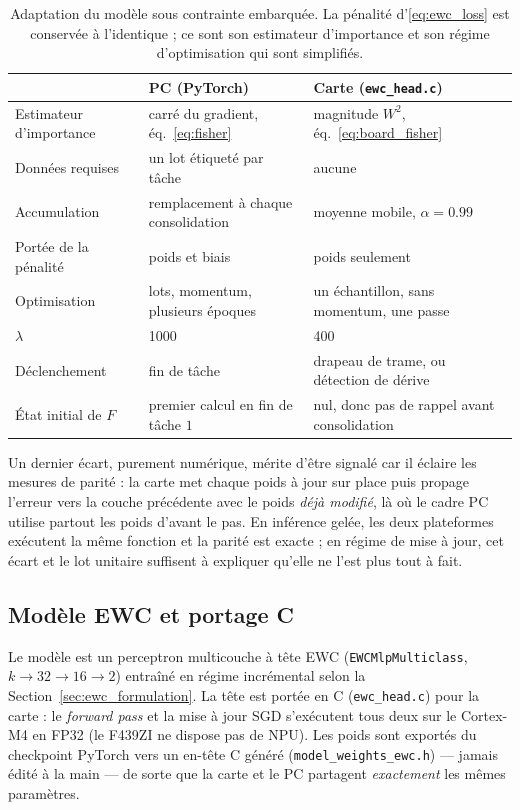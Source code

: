 \begin{table}[htbp]
\centering
\caption{Adaptation du modèle sous contrainte embarquée. La pénalité d'\eqref{eq:ewc_loss} est
conservée à l'identique ; ce sont son estimateur d'importance et son régime d'optimisation qui sont
simplifiés.}
\label{tab:ewc_port}
\footnotesize
\begin{tabular}{@{}p{30mm}p{35mm}p{50mm}@{}}
\toprule
 & \textbf{PC (PyTorch)} & \textbf{Carte (\texttt{ewc\_head.c})} \\
\midrule
Estimateur d'importance & carré du gradient, éq.~\eqref{eq:fisher} & magnitude $W^2$, éq.~\eqref{eq:board_fisher} \\
Données requises        & un lot étiqueté par tâche & aucune \\
Accumulation            & remplacement à chaque consolidation & moyenne mobile, $\alpha = \num{0.99}$ \\
Portée de la pénalité   & poids et biais & poids seulement \\
Optimisation            & lots, momentum, plusieurs époques & un échantillon, sans momentum, une passe \\
$\lambda$               & \num{1000} & \num{400} \\
Déclenchement           & fin de tâche & drapeau de trame, ou détection de dérive \\
État initial de $F$     & premier calcul en fin de tâche $1$ & nul, donc pas de rappel avant consolidation \\
\bottomrule
\end{tabular}
\end{table}

Un dernier écart, purement numérique, mérite d'être signalé car il éclaire les mesures de parité :
la carte met chaque poids à jour sur place puis propage l'erreur vers la couche précédente avec le
poids \emph{déjà modifié}, là où le cadre PC utilise partout les poids d'avant le pas. En inférence
gelée, les deux plateformes exécutent la même fonction et la parité est exacte ; en régime de mise à
jour, cet écart et le lot unitaire suffisent à expliquer qu'elle ne l'est plus tout à fait.

\subsection{Modèle EWC et portage C}

Le modèle est un perceptron multicouche à tête EWC (\texttt{EWCMlpMulticlass}, $k \to 32 \to 16 \to 2$)
entraîné en régime incrémental selon la Section~\ref{sec:ewc_formulation}. La tête est portée en C
(\texttt{ewc\_head.c}) pour la carte : le \emph{forward pass} et la mise à jour \gls{SGD} s'exécutent tous deux
sur le Cortex-M4 en FP32 (le F439ZI ne dispose pas de NPU). Les poids sont exportés du checkpoint PyTorch
vers un en-tête C généré (\texttt{model\_weights\_ewc.h}) --- jamais édité à la main --- de sorte que la
carte et le PC partagent \emph{exactement} les mêmes paramètres.

